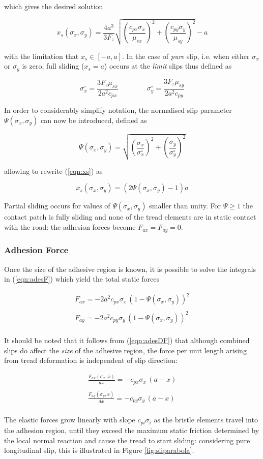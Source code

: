 \documentclass[12pt,a4paper]{report}
\newcommand{\eq}[2]{
\begin{equation} \label{#1}
#2
\end{equation}
}
\newcommand{\req}[1]{
(\ref{#1})
}
\begin{document}
which gives the desired solution

\eq{eqn:xs}{ x_s(\sigma_x , \sigma_y)=\frac{4a^3}{3F_z}\sqrt{\left(\frac{c_{px} \sigma_x}{\mu_{sx}}\right)^2 + \left(\frac{c_{py} \sigma_y}{\mu_{sy}}\right)^2}-a}
with the limitation that $x_s \in [-a,a]$.
In the case of \emph{pure} slip, i.e. when either $\sigma_x$ or $\sigma_y$ is zero, full sliding ($x_s = a$) occurs at the \emph{limit} slips thus defined as

\eq{eqn:limitslips}{\sigma^\circ_x = \frac{3F_z \mu_{sx}}{2a^2c_{px}} \qquad \qquad \sigma^\circ_y = \frac{3F_z \mu_{sy}}{2a^2c_{py}}}

In order to considerably simplify notation, the normalised slip parameter $\Psi(\sigma_x,\sigma_y)$ can now be introduced, defined as

\eq{eqn:PSI}{\Psi(\sigma_x,\sigma_y) = \sqrt{\left(\frac{\sigma_x}{\sigma^\circ_x}\right)^2 + \left(\frac{\sigma_y}{\sigma^\circ_y}\right)^2}}

allowing to rewrite \req{eqn:xs} as

\eq{eqn:xsPsi}{x_s(\sigma_x,\sigma_y) = (2\Psi(\sigma_x,\sigma_y) - 1)a}

Partial sliding occurs for values of $\Psi(\sigma_x,\sigma_y)$ smaller than unity. For $\Psi \geq 1$ the contact patch is fully sliding and none of the tread elements are in static contact with the road: the adhesion forces become $F_{ax} = F_{ay} = 0$. 

\subsubsection*{Adhesion Force}
Once the size of the adhesive region is known, it is possible to solve the integrals in \req{eqn:adesF} which yield the total static forces
\eq{eqn:adesFpsi}{
\begin{array}{c}
F_{ax} = -2a^2c_{px}\sigma_x \, (1-\Psi(\sigma_x,\sigma_y))^2\\
 \\
F_{ay} = -2a^2c_{py}\sigma_y \, (1-\Psi(\sigma_x,\sigma_y))^2\\
\end{array}
}
It should be noted that it follows from \req{eqn:adesDF} that although combined slips do affect the \emph{size} of the adhesive region, the force per unit length arising from tread deformation is independent of slip direction:
\eq{eqn:dfdx}{
\begin{array}{c}
\displaystyle \frac{F_{ax}(\sigma_x , x)}{dx} = -c_{px}\sigma_x \, (a-x)\\
 \\
\displaystyle \frac{F_{ay}(\sigma_y , x)}{dx} = -c_{py}\sigma_y \, (a-x)\\
\end{array}
}
The elastic forces grow linearly with slope $c_{p i} \sigma_i$ as the bristle elements travel into the adhesion region, until they exceed the maximum static friction determined by the local normal reaction and cause the tread to start sliding: considering pure longitudinal slip, this is illustrated in Figure \ref{fig:sliparabola}.
\end{document}
